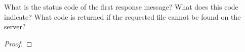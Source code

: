 \documentclass[../../main.tex]{subfiles}
\begin{document}
\begin{wts}
What is the status code of the first response message? What does this code indicate? What code is returned if the requested file cannot be found on the server?
\end{wts}
\begin{proof}

\end{proof}
\end{document}
